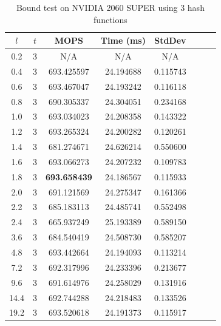 \documentclass[10pt,twocolumn,letterpaper]{article}
\begin{document}
\begin{table}[!h]
    \centering
   \begin{tabular}{@{}c|ccccccc@{}}
\toprule
$l$ & $t$ & MOPS    & Time (ms)& StdDev  \\ \midrule
0.2 & 3 & N/A & N/A & N/A \\
0.4 & 3 & 693.425597 & 24.194688 & 0.115743 \\
0.6 & 3 & 693.467047 & 24.193242 & 0.116118 \\
0.8 & 3 & 690.305337 & 24.304051 & 0.234168 \\
1.0 & 3 & 693.034023 & 24.208358 & 0.143322 \\
1.2 & 3 & 693.265324 & 24.200282 & 0.120261 \\
1.4 & 3 & 681.274671 & 24.626214 & 0.550600 \\
1.6 & 3 & 693.066273 & 24.207232 & 0.109783 \\
1.8 & 3 & \textbf{693.658439} & 24.186567 & 0.115933 \\
2.0 & 3 & 691.121569 & 24.275347 & 0.161366 \\
2.2 & 3 & 685.183113 & 24.485741 & 0.552498 \\
2.4 & 3 & 665.937249 & 25.193389 & 0.589150 \\
3.6 & 3 & 684.540419 & 24.508730 & 0.585207 \\
4.8 & 3 & 693.442664 & 24.194093 & 0.113214 \\
7.2 & 3 & 692.317996 & 24.233396 & 0.213677 \\
9.6 & 3 & 691.614976 & 24.258029 & 0.131916 \\
14.4 & 3 & 692.744288 & 24.218483 & 0.133526 \\
19.2 & 3 & 693.520618 & 24.191373 & 0.115917 \\
\bottomrule
\end{tabular}
    \caption{Bound test on NVIDIA 2060 SUPER using $3$ hash functions}
    \label{tab:bound_3_2060}
\end{table}
\end{document}
